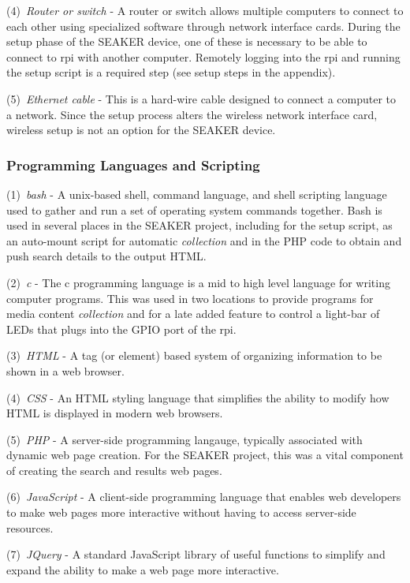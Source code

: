 \documentclass[12pt]{article}
\begin{document}
(4)~{\em Router or switch} - A router or switch allows multiple computers
to connect to each other using specialized software through network
interface cards.  During the setup phase of the SEAKER device,
one of these is necessary to be able to connect to \gls{rpi} with
another computer.  Remotely logging into the \gls{rpi} and running the
setup script is a required step (see setup steps in the appendix).

(5)~{\em Ethernet cable} - This is a hard-wire cable designed to connect
a computer to a network.  Since the setup process alters the wireless
network interface card, wireless setup is not an option for the SEAKER
device.


\subsubsection{Programming Languages and Scripting}

(1)~{\em bash} - A unix-based shell, command language, and shell
scripting language used to gather and run a set of operating system
commands together.  Bash is used in several places in the SEAKER
project, including for the setup script, as an auto-mount script
for automatic {\em collection} and in the PHP code to obtain and
push search details to the output HTML.

(2)~{\em c} - The c programming language is a mid to high level
language for writing computer programs.  This was used in two
locations to provide programs for media content {\em collection}
and for a late added feature to control a light-bar of LEDs that
plugs into the GPIO port of the \gls{rpi}.

(3)~{\em HTML} - A tag (or element) based system of organizing
information to be shown in a web browser.

(4)~{\em CSS} - An HTML styling language that simplifies the
ability to modify how HTML is displayed in modern web browsers.

(5)~{\em PHP} - A server-side programming langauge, typically
associated with dynamic web page creation.  For the SEAKER
project, this was a vital component of creating the search and
results web pages.

(6)~{\em JavaScript} - A client-side programming language that 
enables web developers to make web pages more interactive without
having to access server-side resources.

(7)~{\em JQuery} - A standard JavaScript library of useful
functions to simplify and expand the ability to make a web page
more interactive.
\end{document}

